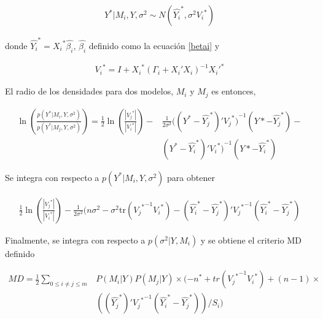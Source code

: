 \begin{equation*}
	\begin{aligned}
		Y^{*} | M_i, Y, \sigma^{2} \sim N(\hat{{Y_i}}^{*}, \sigma^{2} {V_i}^{*})
	\end{aligned}
\end{equation*}

\noindent donde $\hat{{Y_i}}^{*} = {X_i}^{*} \hat{\beta_i}$, $\hat{\beta_i}$ definido como la ecuación \ref{betai} y 

\begin{equation*}
	\begin{aligned}
	{V_i}^{*} = I + {X_i}^{*}(\Gamma_i + X_i'X_i)^{-1} {X_i'}^{*}
	\end{aligned}
\end{equation*}

\noindent El radio de los densidades para dos modelos, $M_i$ y $M_j$ es entonces, 

\begin{equation*}
	\begin{aligned}
		\ln(\frac{p(Y^{*} | M_i, Y, \sigma^{2})}{p(Y^{*}| M_j, Y, \sigma^{2})}) =  \frac{1}{2} \ln(\frac{|{V_j}^{*}|}{|{V_i}^{*}|}) - &
		 \frac{1}{2 \sigma^{2}} ((Y^{*} - \hat{{Y_j}}^{*})' {{V_j}^{*})}^{-1}(Y* - \hat{{Y_j}}^{*}) - \\
		 & (Y^{*} - \hat{{Y_i}}^{*})'{{V_i}^{*})}^{-1}(Y* - \hat{{Y_i}}^{*})
	\end{aligned}
\end{equation*}

Se integra con respecto a $p(Y^{*} | M_i, Y, \sigma^{2})$ para obtener

\begin{equation*}
	\begin{aligned}
		\frac{1}{2} \ln(\frac{|{V_j}^{*}|}{|{V_i}^{*}|}) - \frac{1}{2 \sigma^{2}}(n\sigma^{2} - \sigma^{2}\text{tr}({{V_j}^{*}}^{-1}{V_i}^{*}) - (\hat{{Y_i}}^{*} - \hat{{Y_j}}^{*})'{{V_j}^{*}}^{-1}(\hat{{Y_i}}^{*} - \hat{{Y_j}}^{*})
	\end{aligned}
\end{equation*}

Finalmente, se integra con respecto a $p(\sigma^{2} | Y, M_i)$ y se obtiene el criterio MD definido 

\begin{equation} \label{formula_MD}
	\begin{aligned}
		MD =  \frac{1}{2} \sum_{0 \leq i \neq j \leq m} & P(M_i | Y)  P(M_j | Y) \times  (-n^{*} + tr({{V_j}^{*}}^{-1}{V_i}^{*}) + (n-1) \times \\
		& ((\hat{{Y_j}}^{*})'{{V_j}^{*}}^{-1}(\hat{{Y_i}}^{*} - \hat{{Y_j}}^{*}))/S_i)
	\end{aligned}
\end{equation}

